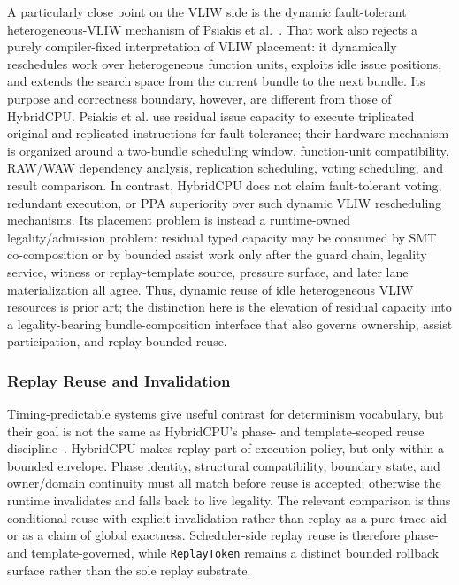 \documentclass[twocolumn]{article}
\begin{document}
A particularly close point on the VLIW side is the dynamic
fault-tolerant heterogeneous-VLIW mechanism of Psiakis
et al.~\cite{Psiakis2022DynamicFTVLIW}. That work also
rejects a purely compiler-fixed interpretation of VLIW
placement: it dynamically reschedules work over heterogeneous
function units, exploits idle issue positions, and extends the
search space from the current bundle to the next bundle. Its
purpose and correctness boundary, however, are different from
those of HybridCPU. Psiakis et al. use residual issue capacity
to execute triplicated original and replicated instructions for
fault tolerance; their hardware mechanism is organized around
a two-bundle scheduling window, function-unit compatibility,
RAW/WAW dependency analysis, replication scheduling, voting
scheduling, and result comparison. In contrast, HybridCPU does
not claim fault-tolerant voting, redundant execution, or PPA
superiority over such dynamic VLIW rescheduling mechanisms.
Its placement problem is instead a runtime-owned
legality/admission problem: residual typed capacity may be
consumed by SMT co-composition or by bounded assist work
only after the guard chain, legality service, witness or
replay-template source, pressure surface, and later lane
materialization all agree. Thus, dynamic reuse of idle
heterogeneous VLIW resources is prior art; the distinction here
is the elevation of residual capacity into a legality-bearing
bundle-composition interface that also governs ownership,
assist participation, and replay-bounded reuse.


\subsubsection{Replay Reuse and Invalidation}

Timing-predictable systems give useful contrast for determinism vocabulary, but their goal is not the same as HybridCPU's phase- and template-scoped reuse discipline~\cite{edwards2007pret,zimmer2014flexpret,reineke2011pret}. HybridCPU makes replay part of execution policy, but only within a bounded envelope. Phase identity, structural compatibility, boundary state, and owner/domain continuity must all match before reuse is accepted; otherwise the runtime invalidates and falls back to live legality. The relevant comparison is thus conditional reuse with explicit invalidation rather than replay as a pure trace aid or as a claim of global exactness. Scheduler-side replay reuse is therefore phase- and template-governed, while \texttt{ReplayToken} remains a distinct bounded rollback surface rather than the sole replay substrate.
\end{document}
